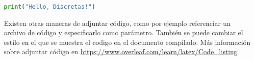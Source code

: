 \documentclass[12pt]{article}
\begin{document}
\begin{lstlisting}[language=Python]
print("Hello, Discretas!")
\end{lstlisting}

Existen otras maneras de adjuntar código, como por ejemplo referenciar un archivo de código y especificarlo como parámetro. También se puede cambiar el estilo en el que se muestra el codigo en el documento compilado. Más información sobre adjuntar código en \href{https://www.overleaf.com/learn/latex/Code_listing}{https://www.overleaf.com/learn/latex/Code\_listing}







\end{document}
